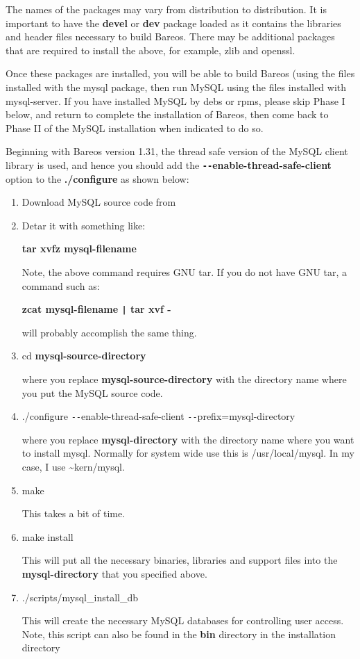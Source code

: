 The names of the packages may vary from distribution to
distribution. It is important to have the {\bf devel} or {\bf dev} package loaded as
it contains the libraries and header files necessary to build
Bareos.  There may be additional packages that are required to
install the above, for example, zlib and openssl.

Once these packages are installed, you will be able to build Bareos (using
the files installed with the mysql package, then run MySQL using the
files installed with mysql-server. If you have installed MySQL by debs or rpms,
please skip Phase I below, and return to complete the installation of
Bareos, then come back to Phase II of the MySQL installation when indicated
to do so.

Beginning with Bareos version 1.31, the thread safe version of the
MySQL client library is used, and hence you should add the {\bf
\verb:--:enable-thread-safe-client} option to the {\bf
./configure} as shown below:

\begin{enumerate}
\item Download MySQL source code from

\item Detar it with something like:

   {\bf tar xvfz mysql-filename}

Note, the above command requires GNU tar. If you do not  have GNU tar, a
command such as:

{\bf zcat mysql-filename \verb+|+ tar xvf - }

will probably accomplish the same thing.

\item cd {\bf mysql-source-directory}

   where you replace {\bf mysql-source-directory} with the  directory name where
   you put the MySQL source code.

\item ./configure \verb:--:enable-thread-safe-client \verb:--:prefix=mysql-directory

   where you replace {\bf mysql-directory} with the directory  name where you
   want to install mysql. Normally for system  wide use this is /usr/local/mysql.
   In my case, I use  \~{}kern/mysql.

\item make

   This takes a bit of time.

\item make install

   This will put all the necessary binaries, libraries and support  files into
   the {\bf mysql-directory} that you specified above.

\item ./scripts/mysql\_install\_db

   This will create the necessary MySQL databases for controlling  user access.
Note, this script can also be found in the  {\bf bin} directory in the
installation directory

\end{enumerate}

